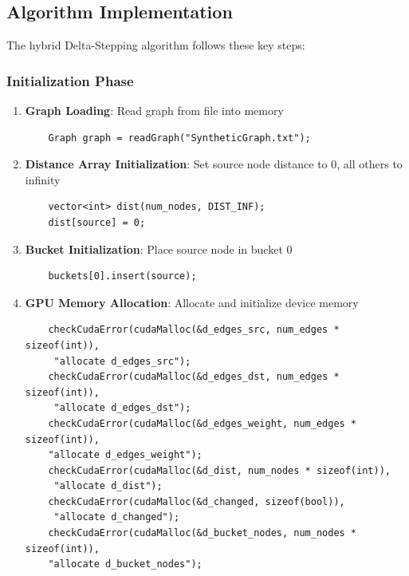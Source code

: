 \documentclass{article}
\begin{document}
\subsection*{Algorithm Implementation}

The hybrid Delta-Stepping algorithm follows these key steps:

\subsubsection*{Initialization Phase}
\begin{enumerate}
    \item \textbf{Graph Loading}: Read graph from file into memory
    \begin{verbatim}
    Graph graph = readGraph("SyntheticGraph.txt");
    \end{verbatim}
    
    \item \textbf{Distance Array Initialization}: Set source node distance to 0, all others to infinity
    \begin{verbatim}
    vector<int> dist(num_nodes, DIST_INF);
    dist[source] = 0;
    \end{verbatim}
    
    \item \textbf{Bucket Initialization}: Place source node in bucket 0
    \begin{verbatim}
    buckets[0].insert(source);
    \end{verbatim}
    
    \item \textbf{GPU Memory Allocation}: Allocate and initialize device memory
    \begin{verbatim}
    checkCudaError(cudaMalloc(&d_edges_src, num_edges * sizeof(int)),
     "allocate d_edges_src");
    checkCudaError(cudaMalloc(&d_edges_dst, num_edges * sizeof(int)),
     "allocate d_edges_dst");
    checkCudaError(cudaMalloc(&d_edges_weight, num_edges * sizeof(int)), 
    "allocate d_edges_weight");
    checkCudaError(cudaMalloc(&d_dist, num_nodes * sizeof(int)),
     "allocate d_dist");
    checkCudaError(cudaMalloc(&d_changed, sizeof(bool)),
     "allocate d_changed");
    checkCudaError(cudaMalloc(&d_bucket_nodes, num_nodes * sizeof(int)), 
    "allocate d_bucket_nodes");
    \end{verbatim}
    

\end{enumerate}
\end{document}
